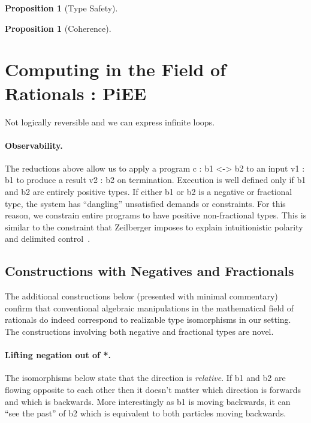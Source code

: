 \documentclass[preprint]{sigplanconf}
\newtheorem{proposition}[theorem]{Proposition}
\begin{document}
\begin{proposition}[Type Safety]
  
\end{proposition}

\begin{proposition}[Coherence]
  
\end{proposition}

\section{Computing in the Field of Rationals : {{PiEE}} }

Not logically reversible and we can express infinite loops.

\paragraph*{Observability.} 

The reductions above allow us to apply a program {{c : b1 <-> b2}} to an
input {{v1 : b1}} to produce a result {{v2 : b2}} on termination. Execution
is well defined only if {{b1}} and {{b2}} are entirely positive types. If
either {{b1}} or {{b2}} is a negative or fractional type, the system has
``dangling'' unsatisfied demands or constraints. For this reason, we
constrain entire programs to have positive non-fractional types. This is
similar to the constraint that Zeilberger imposes to explain intuitionistic
polarity and delimited control~\cite{10.1109/LICS.2010.23}.

\subsection{Constructions with Negatives and Fractionals}
\label{sec:specific-constructions}

The additional constructions below (presented with minimal commentary)
confirm that conventional algebraic manipulations in the mathematical field
of rationals do indeed correspond to realizable type isomorphisms in our
setting. The constructions involving both negative and fractional types are
novel.

\paragraph*{Lifting negation out of {{*}}.}
The isomorphisms below state that the direction is \emph{relative}. If {{b1}}
and {{b2}} are flowing opposite to each other then it doesn't matter which
direction is forwards and which is backwards. More interestingly as {{b1}} is
moving backwards, it can ``see the past'' of {{b2}} which is equivalent to
both particles moving backwards.
\end{document}
